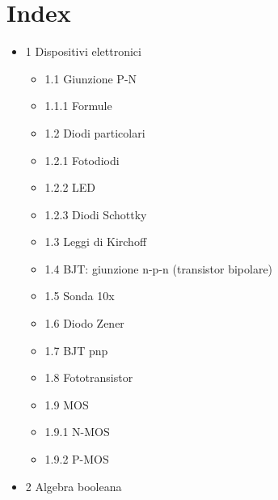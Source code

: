 \documentclass[
]{article}
\author{}
\date{}
\providecommand{\tightlist}{%
  \setlength{\itemsep}{0pt}\setlength{\parskip}{0pt}}
\begin{document}
\section{Index}\label{index}

\begin{itemize}
\tightlist
\item
  1 Dispositivi elettronici

  \begin{itemize}
  \tightlist
  \item
    1.1 Giunzione P-N
  \item
    1.1.1 Formule
  \item
    1.2 Diodi particolari
  \item
    1.2.1 Fotodiodi
  \item
    1.2.2 LED
  \item
    1.2.3 Diodi Schottky
  \item
    1.3 Leggi di Kirchoff
  \item
    1.4 BJT: giunzione n-p-n (transistor bipolare)
  \item
    1.5 Sonda 10x
  \item
    1.6 Diodo Zener
  \item
    1.7 BJT pnp
  \item
    1.8 Fototransistor
  \item
    1.9 MOS
  \item
    1.9.1 N-MOS
  \item
    1.9.2 P-MOS
  \end{itemize}
\item
  2 Algebra booleana


\end{itemize}
\end{document}
